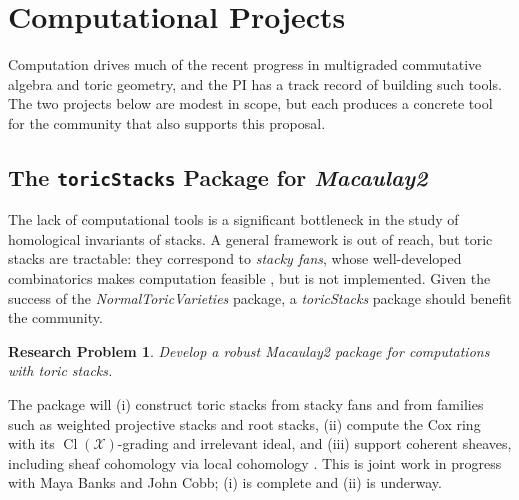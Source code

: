\documentclass[11pt,reqno]{amsart}
\newtheorem{problem}[lemma]{Research Problem}
\theoremstyle{remark}
\newcommand{\Cl}{\operatorname{Cl}}
\newcommand{\cX}{\mathcal{X}}
\begin{document}
\section{Computational Projects}
Computation drives much of the recent progress in multigraded commutative algebra and toric geometry, and the PI has a track record of building such tools. The two projects below are modest in scope, but each produces a concrete tool for the community that also supports this proposal.

 \subsection{The \texttt{toricStacks} Package for \textit{Macaulay2}}

The lack of computational tools is a significant bottleneck in the study of homological invariants of stacks. A general framework is out of reach, but toric stacks are tractable: they correspond to \emph{stacky fans}, whose well-developed combinatorics makes computation feasible \cite{toricStacks1,toricStacks2,borisovChenSmith05}, but is not implemented. Given the success of the \textit{NormalToricVarieties} package, a \textit{toricStacks} package should benefit the community.

\begin{problem}\label{prob:toric-stacks-m2}
Develop a robust \textit{Macaulay2} package for computations with toric stacks.
\end{problem}

The package will (i) construct toric stacks from stacky fans and from families such as weighted projective stacks and root stacks, (ii) compute the Cox ring with its $\Cl(\cX)$-grading and irrelevant ideal, and (iii) support coherent sheaves, including sheaf cohomology via local cohomology \cite{EMS00}. This is joint work in progress with Maya Banks and John Cobb; (i) is complete and (ii) is underway.

\end{document}
